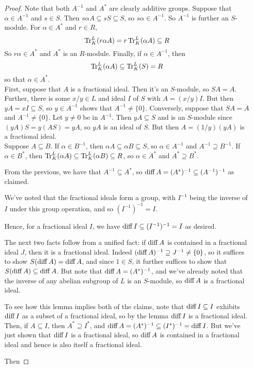 \begin{proof}
	Note that both $A^{-1}$ and $A^\ast$ are clearly additive groups. Suppose that $\alpha \in A^{-1}$ and $s \in S$. Then $s\alpha A \subseteq sS \subseteq S$, so $s\alpha \in A^{-1}$. So $A^{-1}$ is further an $S$-module. For $\alpha \in A^\ast$ and $r \in R$,
	\[ \operatorname{Tr}^L_K(r\alpha A) = r\operatorname{Tr}^L_K(\alpha A) \subseteq R \]
	So $r\alpha \in A^\ast$ and $A^\ast$ is an $R$-module. Finally, if $\alpha \in A^{-1}$, then
	\[ \operatorname{Tr}^L_K(\alpha A) \subseteq \operatorname{Tr}^L_K(S) = R \]
	so that $\alpha \in A^\ast$. \\
	
	First, suppose that $A$ is a fractional ideal. Then it's an $S$-module, so $SA = A$. Further, there is some $x/y \in L$ and ideal $I$ of $S$ with $A = (x/y)I$. But then $yA = xI \subseteq S$, so $y \in A^{-1}$ shows that $A^{-1} \neq \{0\}$. Conversely, suppose that $SA = A$ and $A^{-1} \neq \{0\}$. Let $y \neq 0$ be in $A^{-1}$. Then $yA \subseteq S$ and is an $S$-module since $(yA)S = y(AS) = yA$, so $yA$ is an ideal of $S$. But then $A = (1/y)(yA)$ is a fractional ideal. \\
	
	Suppose $A \subseteq B$. If $\alpha \in B^{-1}$, then $\alpha A \subseteq \alpha B \subseteq S$, so $\alpha \in A^{-1}$ and $A^{-1} \supseteq B^{-1}$. If $\alpha \in B^\ast$, then $\operatorname{Tr}^L_K(\alpha A) \subseteq \operatorname{Tr}^L_K(\alpha B) \subseteq R$, so $\alpha \in A^\ast$ and $A^\ast \supseteq B^\ast$.
	
	From the previous, we have that $A^{-1} \subseteq A^\ast$, so $\operatorname{diff} A = (A^\ast)^{-1} \subseteq (A^{-1})^{-1}$ as claimed.
	
	We've noted that the fractional ideals form a group, with $I^{-1}$ being the inverse of $I$ under this group operation, and so $(I^{-1})^{-1} = I$.
	
	Hence, for a fractional ideal $I$, we have $\operatorname{diff} I \subseteq (I^{-1})^{-1} = I$ as desired.
	
	The next two facts follow from a unified fact: if $\operatorname{diff} A$ is contained in a fractional ideal $J$, then it is a fractional ideal. Indeed $(\operatorname{diff} A)^{-1} \supseteq J^{-1} \neq \{0\}$, so it suffices to show $S(\operatorname{diff} A) = \operatorname{diff} A$, and since $1 \in S$, it further suffices to show that $S(\operatorname{diff} A) \subseteq \operatorname{diff} A$. But note that $\operatorname{diff} A = (A^\ast)^{-1}$, and we've already noted that the inverse of any abelian subgroup of $L$ is an $S$-module, so $\operatorname{diff} A$ is a fractional ideal.
	
	To see how this lemma implies both of the claims, note that $\operatorname{diff} I \subseteq I$ exhibits $\operatorname{diff} I$ as a subset of a fractional ideal, so by the lemma $\operatorname{diff} I$ is a fractional ideal. Then, if $A \subseteq I$, then $A^\ast \supseteq I^\ast$, and $\operatorname{diff} A = (A^\ast)^{-1} \subseteq (I^\ast)^{-1} = \operatorname{diff} I$. But we've just shown that $\operatorname{diff} I$ is a fractional ideal, so $\operatorname{diff} A$ is contained in a fractional ideal and hence is also itself a fractional ideal.
	
	Then
\end{proof}
